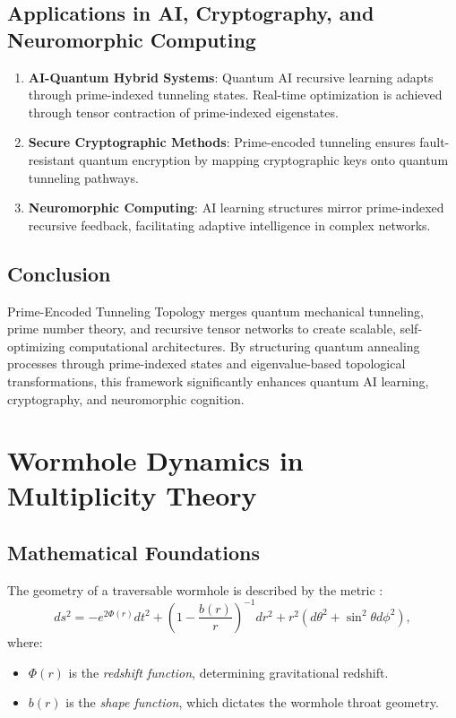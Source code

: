 \documentclass{article}
\theoremstyle{plain}
\begin{document}
\begin{itemize}
\begin{itemize}
\subsection{Applications in AI, Cryptography, and Neuromorphic Computing}
\begin{enumerate}
    \item \textbf{AI-Quantum Hybrid Systems}: Quantum AI recursive learning adapts through prime-indexed tunneling states. Real-time optimization is achieved through tensor contraction of prime-indexed eigenstates.
    \item \textbf{Secure Cryptographic Methods}: Prime-encoded tunneling ensures fault-resistant quantum encryption by mapping cryptographic keys onto quantum tunneling pathways.
    \item \textbf{Neuromorphic Computing}: AI learning structures mirror prime-indexed recursive feedback, facilitating adaptive intelligence in complex networks.
\end{enumerate}

\subsection{Conclusion}
Prime-Encoded Tunneling Topology merges quantum mechanical tunneling, prime number theory, and recursive tensor networks to create scalable, self-optimizing computational architectures. By structuring quantum annealing processes through prime-indexed states and eigenvalue-based topological transformations, this framework significantly enhances quantum AI learning, cryptography, and neuromorphic cognition.


\section{Wormhole Dynamics in Multiplicity Theory}

\subsection{Mathematical Foundations}

The geometry of a traversable wormhole is described by the metric \cite{morris1988wormholes}:
\begin{equation}
ds^2 = -e^{2\Phi(r)} dt^2 + \left(1 - \frac{b(r)}{r} \right)^{-1} dr^2 + r^2(d\theta^2 + \sin^2\theta d\phi^2),
\end{equation}
where:
\begin{itemize}
    \item $\Phi(r)$ is the \textit{redshift function}, determining gravitational redshift.
    \item $b(r)$ is the \textit{shape function}, which dictates the wormhole throat geometry.
\end{itemize}


\end{itemize}
\end{itemize}
\end{document}

